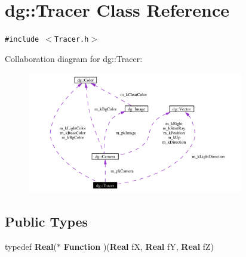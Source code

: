 \section{dg::Tracer Class Reference}
\label{classdg_1_1Tracer}
{\tt \#include $<$Tracer.h$>$}

Collaboration diagram for dg::Tracer:\begin{figure}[H]
\begin{center}
\leavevmode
\includegraphics[width=267pt]{classdg_1_1Tracer__coll__graph}
\end{center}
\end{figure}
\subsection*{Public Types}
\begin{CompactItemize}
\item 
typedef {\bf Real}($\ast$ {\bf Function} )({\bf Real} f\-X, {\bf Real} f\-Y, {\bf Real} f\-Z)
\end{CompactItemize}
